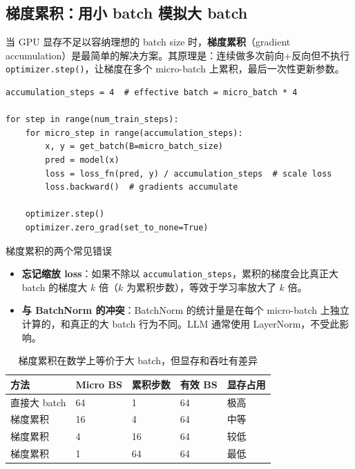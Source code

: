 \subsection{梯度累积：用小 batch 模拟大 batch}

当 GPU 显存不足以容纳理想的 batch size 时，\textbf{梯度累积}（gradient accumulation）是最简单的解决方案。其原理是：连续做多次前向+反向但不执行 \texttt{optimizer.step()}，让梯度在多个 micro-batch 上累积，最后一次性更新参数。

\begin{lstlisting}[caption={梯度累积的标准实现}]
accumulation_steps = 4  # effective batch = micro_batch * 4

for step in range(num_train_steps):
    for micro_step in range(accumulation_steps):
        x, y = get_batch(B=micro_batch_size)
        pred = model(x)
        loss = loss_fn(pred, y) / accumulation_steps  # scale loss
        loss.backward()  # gradients accumulate

    optimizer.step()
    optimizer.zero_grad(set_to_none=True)
\end{lstlisting}

\begin{warningbox}{梯度累积的两个常见错误}
\begin{itemize}
    \item \textbf{忘记缩放 loss}：如果不除以 \texttt{accumulation\_steps}，累积的梯度会比真正大 batch 的梯度大 $k$ 倍（$k$ 为累积步数），等效于学习率放大了 $k$ 倍。
    \item \textbf{与 BatchNorm 的冲突}：BatchNorm 的统计量是在每个 micro-batch 上独立计算的，和真正的大 batch 行为不同。LLM 通常使用 LayerNorm，不受此影响。
\end{itemize}
\end{warningbox}

\begin{table}[H]
\centering
\begin{tabular}{p{}p{}p{}p{}p{}}
\toprule
\textbf{方法} & \textbf{Micro BS} & \textbf{累积步数} & \textbf{有效 BS} & \textbf{显存占用} \\
\midrule
直接大 batch & 64 & 1 & 64 & 极高 \\
梯度累积 & 16 & 4 & 64 & 中等 \\
梯度累积 & 4 & 16 & 64 & 较低 \\
梯度累积 & 1 & 64 & 64 & 最低 \\
\bottomrule
\end{tabular}
\caption{梯度累积在数学上等价于大 batch，但显存和吞吐有差异}
\end{table}

